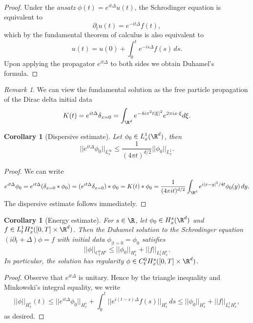 \documentclass[reqno]{amsart}
\newtheorem{corollary}[theorem]{Corollary}
\theoremstyle{definition}
\theoremstyle{remark}
\newtheorem*{remark}{Remark}
\begin{document}
\begin{proof}
	Under the \textit{ansatz} $\phi (t) = e^{it \Delta} u(t)$, the Schrodinger equation is equivalent to 
		\[ \partial_t u (t) = e^{-i t \Delta} f (t),\]
	which by the fundamental theorem of calculus is also equivalent to
		\[ u(t) = u (0) + \int_0^t e^{-i s \Delta} f(s) \, ds. \]	
	Upon applying the propagator $e^{it \Delta}$ to both sides we obtain Duhamel's formula.  	
\end{proof}

\begin{remark}
	We can view the fundamental solution as the free particle propagation of the Dirac delta initial data 
		\[ K(t) = e^{i t \Delta} \delta_{x = 0} = \int_{\R^d} e^{- 4 i \pi^2 t |\xi|^2}  e^{2\pi i x \cdot \xi} d\xi. \]
\end{remark}

\begin{corollary}[Dispersive estimate]
	Let $\phi_0 \in L^1_x (\R^d)$, then 
		\[ ||e^{it \Delta} \phi_0||_{L^\infty_x} \leq \frac{1}{(4\pi t)^{d/2}} || \phi_0||_{L^1_x}. \]
\end{corollary}

\begin{proof}
	We can write
		\[ e^{it \Delta} \phi_0 = e^{it \Delta} (\delta_{x = 0} * \phi_0) = (e^{it \Delta} \delta_{x = 0}) * \phi_0 = K(t) * \phi_0 = \frac{1}{(4\pi i t)^{d/2}} \int_{\R^d} e^{i |x - y|^2/4t} \phi_0 (y) \, dy .\]
	The dispersive estimate follows immediately. 
\end{proof}

\begin{corollary}[Energy estimate]
	For $s \in \R$, let $\phi_0 \in H^s_x (\R^d)$ and $f \in L^1_t H^s_x ([0, T] \times \R^d)$. Then the Duhamel solution to the Schrodinger equation $(i \partial_t + \Delta)\phi = f$ with initial data $\phi_{|t = 0} = \phi_0$ satisfies
		\[ ||\phi||_{C^0_t H^s} \leq ||\phi_0||_{H^s_x} + ||f||_{L^1_t H^s_x}. \]	
	In particular, the solution has regularity $\phi \in C^0_t H^s_x ([0, T] \times \R^d)$. 	
\end{corollary}	

\begin{proof}
	Observe that $e^{i t \Delta}$ is unitary. Hence by the triangle inequality and Minkowski's integral equality, we write
		\[ ||\phi||_{H^s_x} (t) \leq ||e^{it \Delta}\phi_0||_{H^s_x} + \int_0^t ||e^{i (t - s) \Delta} f(s)||_{H^s_x} \, ds \leq ||\phi_0||_{H^s_x} + ||f||_{L^1_t H^s_x}, \]
	as desired. 	
\end{proof}
\end{document}
